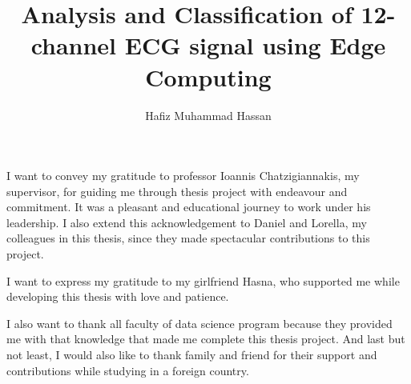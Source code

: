 \documentclass[LaM,binding=0.6cm,oneside]{sapthesis}
\title{Analysis and Classification of 12-channel ECG signal using Edge Computing}
\author{Hafiz Muhammad Hassan}
\begin{document}
\frontmatter

\maketitle






\begin{acknowledgments}
\parskip=12pt

I want to convey my gratitude to professor Ioannis Chatzigiannakis, my supervisor, for guiding me through thesis project with endeavour and commitment. It was a pleasant and educational journey to work under his leadership. I also extend this acknowledgement to Daniel and Lorella, my colleagues in this thesis, since they made spectacular contributions to this project.

I want to express my gratitude to my girlfriend Hasna, who supported me while developing this thesis with love and patience.

I also want to thank all faculty of data science program because they provided me with that knowledge that made me complete this thesis project. And last but not least, I would also like to thank family and friend for their support and contributions while studying in a foreign country.



\end{acknowledgments}

\tableofcontents

\mainmatter

\parskip=5pt













\backmatter
\cleardoublepage
{}
\end{document}
